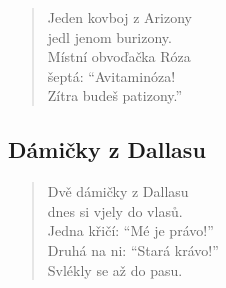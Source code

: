\begin{multicols}{2}
\begin{verse}
Jeden kovboj z Arizony \\
jedl jenom burizony. \\
Místní obvoďačka Róza\\
šeptá: “Avitaminóza!\\
Zítra budeš patizony.”
\end{verse}

\subsection{Dámičky z Dallasu}

\begin{verse}
Dvě dámičky z Dallasu \\
dnes si vjely do vlasů.\\
Jedna křičí: “Mé je právo!”\\
Druhá na ni: “Stará krávo!”\\
Svlékly se až do pasu.

\end{verse}



\end{multicols}